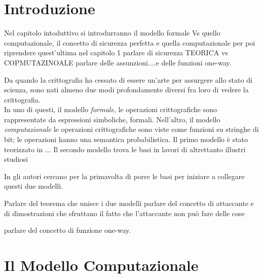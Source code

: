 \documentclass[a4paper,openright,twoside,12pt]{report}
\author{Gian Pietro Farina}
\begin{document}
\chapter{Introduzione}
Nel capitolo intoduttivo si introdurranno il modello formale Vs quello computazionale,
il concetto di sicurezza perfetta e quella computazionale per poi riprendere quest'ultima nel
capitolo 1
parlare di sicurezza TEORICA vs COPMUTAZINOALE
parlare delle assunzioni....e delle funzioni one-way.

Da quando la crittografia ha cessato di essere un'arte per assurgere allo stato di scienza\cite{diffiehelmann77}, sono nati almeno due modi profondamente diversi fra loro di
vedere la crittografia.\\In uno di questi, il modello \emph{formale}, le operazioni crittografiche sono rappresentate da espressioni simboliche, formali.
Nell'altro, il modello \emph{computazionale} le operazioni crittografiche sono viste come funzioni su stringhe di bit; le operazioni hanno una semantica probabilistica.
Il primo modello \`e stato teorizzato in \cite{}...
Il secondo modello trova le basi in lavori di altrettanto illustri studiosi \cite{}

In \cite{DBLP:journals/joc/AbadiR07} gli autori cercano per la primavolta di porre le basi per iniziare a collegare questi due modelli.

Parlare del teorema che unisce i due modelli
parlare del concetto di attaccante e di dimostrazioni che sfruttano 
il fatto che l'attaccante non può fare delle cose

parlare del concetto di funzione one-way.
\chapter{Il Modello Computazionale}
\end{document}
